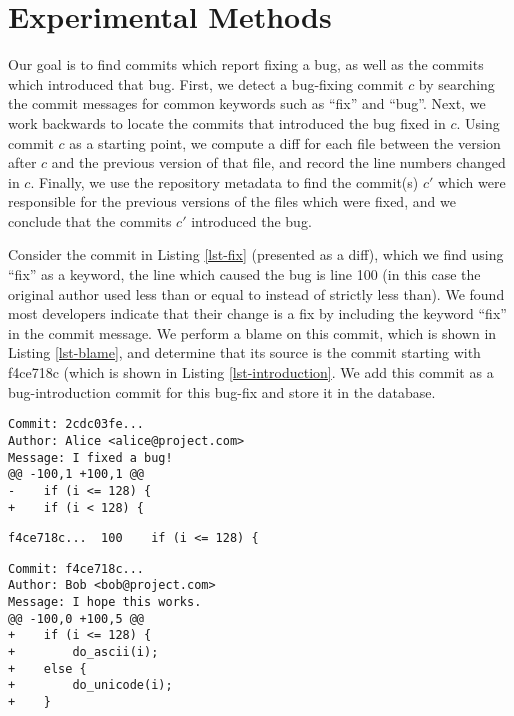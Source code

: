 \section{Experimental Methods}
\label{sec:method}
Our goal is to find commits which report fixing a bug, as well as the commits
which introduced that bug. First, we detect a bug-fixing commit $c$ by
searching the commit messages for common keywords such as ``fix'' and
``bug''. Next, we work backwards to locate the commits that introduced
the bug fixed in $c$. Using commit $c$ as a starting point, we compute
a diff for each file between the version after $c$ and the previous
version of that file, and record the line numbers changed in
$c$. Finally, we use the repository metadata to find the commit(s)
$c'$ which were responsible for the previous versions of the files
which were fixed, and we conclude that the commits $c'$ introduced the
bug.

Consider the commit in Listing \ref{lst-fix} (presented as a diff),
which we find using ``fix'' as a keyword, the line which caused the
bug is line 100 (in this case the original author used less than or
equal to instead of strictly less than). We found most developers
indicate that their change is a fix by including the keyword ``fix''
in the commit message. We perform a blame on this commit, which is
shown in Listing \ref{lst-blame}, and determine that its source is the
commit starting with f4ce718c (which is shown in Listing
\ref{lst-introduction}. We add this commit as a bug-introduction
commit for this bug-fix and store it in the database.

    \begin{lstlisting}[caption=An example bug-fix,label=lst-fix,frame=single]
Commit: 2cdc03fe...
Author: Alice <alice@project.com>
Message: I fixed a bug!
@@ -100,1 +100,1 @@
-    if (i <= 128) {
+    if (i < 128) {
    \end{lstlisting}

    \begin{lstlisting}[caption=Blame of the bug-fix,label=lst-blame,frame=single]
f4ce718c...  100    if (i <= 128) {
    \end{lstlisting}

    \begin{lstlisting}[caption=An example bug-introduction,label=lst-introduction, frame=single]
Commit: f4ce718c...
Author: Bob <bob@project.com>
Message: I hope this works.
@@ -100,0 +100,5 @@
+    if (i <= 128) {
+        do_ascii(i);
+    else {
+        do_unicode(i);
+    }
    \end{lstlisting}

